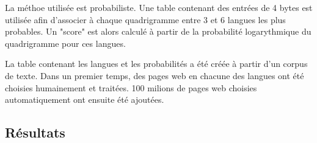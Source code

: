 	La méthoe utilisée est probabiliste. Une table contenant des entrées de 4 bytes est utilisée afin d'associer à chaque quadrigramme entre 3 et 6 langues les plus probables. Un "score" est alors calculé à partir de la probabilité logarythmique du quadrigramme pour ces langues.

	La table contenant les langues et les probabilités a été créée à partir d'un corpus de texte. Dans un premier temps, des pages web en chacune des langues ont été choisies humainement et traitées. 100 milions de pages web choisies automatiquement ont ensuite été ajoutées. 


\subsection{Résultats}

	